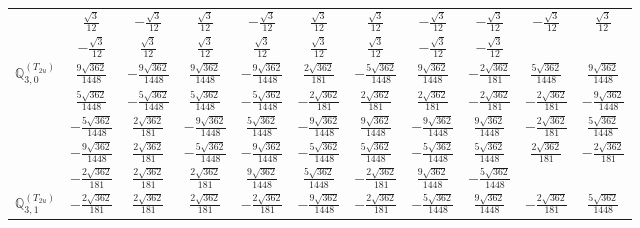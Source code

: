 \documentclass[fleqn,10pt,landscape]{article}
\begin{document}
\begin{itemize}
{\begin{center}
\begin{longtable}{ccccccccccc}
& $ \frac{\sqrt{3}}{12} $ & $ - \frac{\sqrt{3}}{12} $ & $ \frac{\sqrt{3}}{12} $ & $ - \frac{\sqrt{3}}{12} $ & $ \frac{\sqrt{3}}{12} $ & $ \frac{\sqrt{3}}{12} $ & $ - \frac{\sqrt{3}}{12} $ & $ - \frac{\sqrt{3}}{12} $ & $ - \frac{\sqrt{3}}{12} $ & $ \frac{\sqrt{3}}{12} $ \\
& $ - \frac{\sqrt{3}}{12} $ & $ \frac{\sqrt{3}}{12} $ & $ \frac{\sqrt{3}}{12} $ & $ \frac{\sqrt{3}}{12} $ & $ \frac{\sqrt{3}}{12} $ & $ \frac{\sqrt{3}}{12} $ & $ - \frac{\sqrt{3}}{12} $ & $ - \frac{\sqrt{3}}{12} $ & $  $ & $  $ \\ \hline
$\mathbb{Q}_{3,0}^{(T_{2u})}$ & $ \frac{9 \sqrt{362}}{1448} $ & $ - \frac{9 \sqrt{362}}{1448} $ & $ \frac{9 \sqrt{362}}{1448} $ & $ - \frac{9 \sqrt{362}}{1448} $ & $ \frac{2 \sqrt{362}}{181} $ & $ - \frac{5 \sqrt{362}}{1448} $ & $ \frac{9 \sqrt{362}}{1448} $ & $ - \frac{2 \sqrt{362}}{181} $ & $ \frac{5 \sqrt{362}}{1448} $ & $ \frac{9 \sqrt{362}}{1448} $ \\
& $ \frac{5 \sqrt{362}}{1448} $ & $ - \frac{5 \sqrt{362}}{1448} $ & $ \frac{5 \sqrt{362}}{1448} $ & $ - \frac{5 \sqrt{362}}{1448} $ & $ - \frac{2 \sqrt{362}}{181} $ & $ \frac{2 \sqrt{362}}{181} $ & $ \frac{2 \sqrt{362}}{181} $ & $ - \frac{2 \sqrt{362}}{181} $ & $ - \frac{2 \sqrt{362}}{181} $ & $ - \frac{9 \sqrt{362}}{1448} $ \\
& $ - \frac{5 \sqrt{362}}{1448} $ & $ \frac{2 \sqrt{362}}{181} $ & $ - \frac{9 \sqrt{362}}{1448} $ & $ \frac{5 \sqrt{362}}{1448} $ & $ - \frac{9 \sqrt{362}}{1448} $ & $ \frac{9 \sqrt{362}}{1448} $ & $ - \frac{9 \sqrt{362}}{1448} $ & $ \frac{9 \sqrt{362}}{1448} $ & $ - \frac{2 \sqrt{362}}{181} $ & $ \frac{5 \sqrt{362}}{1448} $ \\
& $ - \frac{9 \sqrt{362}}{1448} $ & $ \frac{2 \sqrt{362}}{181} $ & $ - \frac{5 \sqrt{362}}{1448} $ & $ - \frac{9 \sqrt{362}}{1448} $ & $ - \frac{5 \sqrt{362}}{1448} $ & $ \frac{5 \sqrt{362}}{1448} $ & $ - \frac{5 \sqrt{362}}{1448} $ & $ \frac{5 \sqrt{362}}{1448} $ & $ \frac{2 \sqrt{362}}{181} $ & $ - \frac{2 \sqrt{362}}{181} $ \\
& $ - \frac{2 \sqrt{362}}{181} $ & $ \frac{2 \sqrt{362}}{181} $ & $ \frac{2 \sqrt{362}}{181} $ & $ \frac{9 \sqrt{362}}{1448} $ & $ \frac{5 \sqrt{362}}{1448} $ & $ - \frac{2 \sqrt{362}}{181} $ & $ \frac{9 \sqrt{362}}{1448} $ & $ - \frac{5 \sqrt{362}}{1448} $ & $  $ & $  $ \\ \hline
$\mathbb{Q}_{3,1}^{(T_{2u})}$ & $ - \frac{2 \sqrt{362}}{181} $ & $ \frac{2 \sqrt{362}}{181} $ & $ \frac{2 \sqrt{362}}{181} $ & $ - \frac{2 \sqrt{362}}{181} $ & $ - \frac{9 \sqrt{362}}{1448} $ & $ - \frac{2 \sqrt{362}}{181} $ & $ - \frac{5 \sqrt{362}}{1448} $ & $ \frac{9 \sqrt{362}}{1448} $ & $ - \frac{2 \sqrt{362}}{181} $ & $ \frac{5 \sqrt{362}}{1448} $ \\

\end{longtable}
\end{center}}
\end{itemize}
\end{document}
